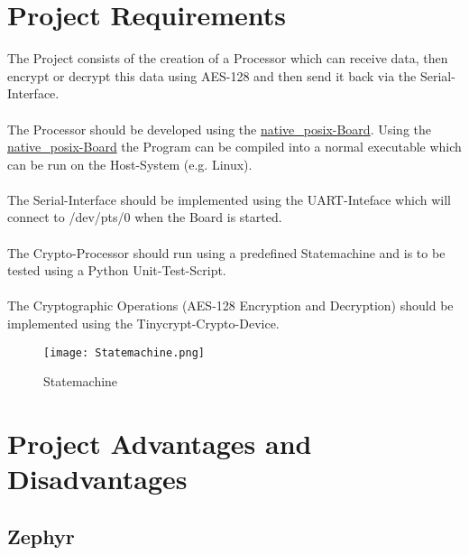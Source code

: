 \section{Project Requirements}

The Project consists of the creation of a Processor which can receive data, then
encrypt or decrypt this data using AES-128 and then send it back via the
Serial-Interface.
\\
\\
The Processor should be developed using the
\href{https://docs.zephyrproject.org/2.0.0/boards/posix/native_posix/doc/index.html?highlight=native_posix}
{native\_posix-Board}.
Using the
\href{https://docs.zephyrproject.org/2.0.0/boards/posix/native_posix/doc/index.html?highlight=native_posix}
{native\_posix-Board} the Program can be compiled into a normal
executable which can be run on the Host-System (e.g. Linux).
\\
\\
The Serial-Interface should be implemented using the UART-Inteface which will connect to
/dev/pts/0 when the Board is started.
\\
\\
The Crypto-Processor should run using a predefined Statemachine and is to be
tested using a Python Unit-Test-Script.
\\
\\
The Cryptographic Operations (AES-128 Encryption and Decryption) should be implemented
using the Tinycrypt-Crypto-Device.

\begin{figure}[!ht]
	\begin{center}
		\texttt{[image: Statemachine.png]}
		\caption{Statemachine}
	\end{center}
\end{figure}

\pagebreak

\section{Project Advantages and Disadvantages}

\subsection{Zephyr}

